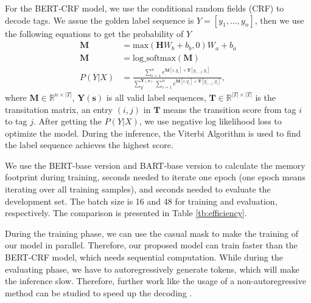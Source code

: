 \documentclass[11pt,a4paper]{article}
\begin{document}
For the BERT-CRF model, we use the conditional random fields (CRF) \cite{lafferty2001conditional} to decode tags. We assue the golden label sequence is $Y=[y_1,...,y_n]$, then we use the following equations to get the probability of $Y$
\begin{align}
  \mathbf{M} & = \mathrm{max}(\mathbf{H}W_b+b_b, 0) W_a + b_a \\
  \mathbf{M} & = \mathrm{log\_softmax}(\mathbf{M}) \\
  P(Y|X) & = \frac{\sum_{i=1}^{n}e^{\mathbf{M}[i, y_i]+\mathbf{T}[y_{i-1}, y_i]}}
  {\sum_{y^{\prime}}^{\mathbf{Y}(\mathbf{s})}\sum_{i=1}^{n}e^{\mathbf{M}[i, y^{\prime}_i]+\mathbf{T}[y^{\prime}_{i-1}, y^{\prime}_i]}},
\end{align}
where $\mathbf{M} \in \mathbb{R}^{n \times |T|}$, $\mathbf{Y}(\mathbf{s})$ is all valid label sequences, $\mathbf{T} \in \mathbb{R}^{|T| \times |T|}$ is the transitation matrix, an entry $(i, j)$ in  $\mathbf{T}$ means the transition score from tag $i$ to tag $j$. After getting the $P(Y|X)$, we use negative log likelihood loss to optimize the model. During the inference, the Viterbi Algorithm is used to find the label sequence achieves the highest score. 

We use the BERT-base version and BART-base version to calculate the memory footprint during training, seconds needed to iterate one epoch (one epoch means iterating over all training samples), and seconds needed to evaluate the development set. The batch size is 16 and 48 for training and evaluation, respectively. The comparison is presented in Table \ref{tb:efficiency}. 

During the training phase, we can use the casual mask to make the training of our model in parallel. Therefore, our proposed model can train faster than the BERT-CRF model, which needs sequential computation. While during the evaluating phase, we have to autoregressively generate tokens, which will make the inference slow. Therefore, further work like the usage of a non-autoregressive method can be studied to speed up the decoding \cite{DBLP:conf/iclr/Gu0XLS18}.
\end{document}
